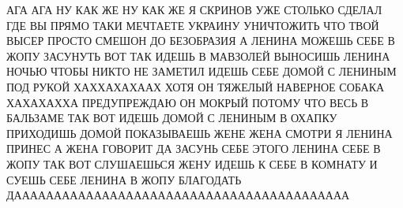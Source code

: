  
 
 
 
 

АГА АГА НУ КАК ЖЕ НУ КАК ЖЕ Я СКРИНОВ УЖЕ СТОЛЬКО СДЕЛАЛ ГДЕ ВЫ ПРЯМО ТАКИ
МЕЧТАЕТЕ УКРАИНУ УНИЧТОЖИТЬ ЧТО ТВОЙ ВЫСЕР ПРОСТО СМЕШОН ДО БЕЗОБРАЗИЯ А ЛЕНИНА
МОЖЕШЬ СЕБЕ В ЖОПУ ЗАСУНУТЬ ВОТ ТАК ИДЕШЬ В МАВЗОЛЕЙ ВЫНОСИШЬ ЛЕНИНА НОЧЬЮ
ЧТОБЫ НИКТО НЕ ЗАМЕТИЛ ИДЕШЬ СЕБЕ ДОМОЙ С ЛЕНИНЫМ ПОД РУКОЙ ХАХХАХАХААХ ХОТЯ ОН
ТЯЖЕЛЫЙ НАВЕРНОЕ СОБАКА ХАХАХАХХА ПРЕДУПРЕЖДАЮ ОН МОКРЫЙ ПОТОМУ ЧТО ВЕСЬ В
БАЛЬЗАМЕ ТАК ВОТ ИДЕШЬ ДОМОЙ С ЛЕНИНЫМ В ОХАПКУ ПРИХОДИШЬ ДОМОЙ ПОКАЗЫВАЕШЬ
ЖЕНЕ ЖЕНА СМОТРИ Я ЛЕНИНА ПРИНЕС А ЖЕНА ГОВОРИТ ДА ЗАСУНЬ СЕБЕ ЭТОГО ЛЕНИНА
СЕБЕ В ЖОПУ ТАК ВОТ СЛУШАЕШЬСЯ ЖЕНУ ИДЕШЬ К СЕБЕ В КОМНАТУ И СУЕШЬ СЕБЕ ЛЕНИНА
В ЖОПУ БЛАГОДАТЬ ДАААААААААААААААААААААААААААААААААААААААААА

